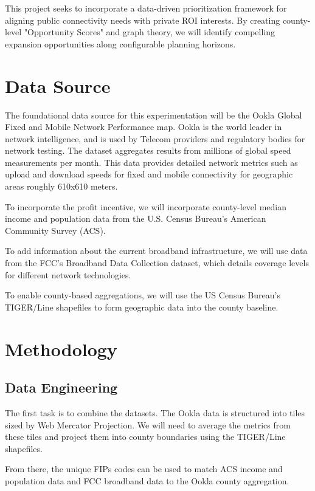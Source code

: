 \documentclass[11pt]{article}
\begin{document}
This project seeks to incorporate a data-driven prioritization framework for aligning public connectivity needs with private ROI interests. By creating county-level "Opportunity Scores" and graph theory, we will identify compelling expansion opportunities along configurable planning horizons.

\section{Data Source}
            
	The foundational data source for this experimentation will be the Ookla Global Fixed and Mobile Network Performance map. Ookla is the world leader in network intelligence, and is used by Telecom providers and regulatory bodies for network testing. The dataset aggregates results from millions of global speed measurements per month. This data provides detailed network metrics such as upload and download speeds for fixed and mobile connectivity for geographic areas roughly 610x610 meters.

	To incorporate the profit incentive, we will incorporate county-level median income and population data from the U.S. Census Bureau's American Community Survey (ACS).

	To add information about the current broadband infrastructure, we will use data from the FCC's Broadband Data Collection dataset, which details coverage levels for different network technologies.

	To enable county-based aggregations, we will use the US Census Bureau's TIGER/Line shapefiles to form geographic data into the county baseline.

\section{Methodology}
        
\subsection{Data Engineering}

	The first task is to combine the datasets. The Ookla data is structured into tiles sized by Web Mercator Projection. We will need to average the metrics from these tiles and project them into county boundaries using the TIGER/Line shapefiles.
	
	From there, the unique FIPs codes can be used to match ACS income and population data and FCC broadband data to the Ookla county aggregation.
\end{document}
